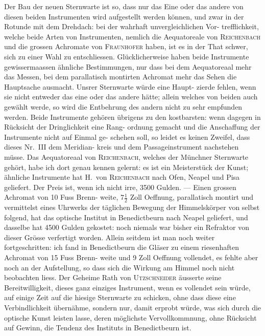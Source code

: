 \documentclass[12pt,a4paper]{article}
\theoremstyle{plain}
\theoremstyle{definition}
\theoremstyle{remark}
\begin{document}
Der Bau der neuen Sternwarte ist so, dass nur das Eine oder das andere
von diesen beiden Instrumenten wird aufgestellt werden k\"{o}nnen, und zwar in
der Rotunde mit dem Drehdach: bei der wahrhaft unvergleichlichen Vor-
trefflichkeit, welche beide Arten von Instrumenten, nemlich die Aequatoreale
von \textsc{Reichenbach} und die grossen Achromate von \textsc{Fraunhofer} haben, ist es in
der That schwer, sich zu einer Wahl zu entschliessen. Gl\"{u}cklicherweise haben
beide Instrumente gewissermaassen \"{a}hnliche Bestimmungen, nur dass bei dem
Aequatoreaal mehr das Messen, bei dem parallatisch montirten Achromat mehr
das Sehen die Hauptsache ausmacht. Unsrer Sternwarte w\"{u}rde eine Haupt-
zierde fehlen, wenn sie nicht entweder das eine oder das andere h\"{a}tte; allein
welches von beiden auch gew\"{a}hlt werde, so wird die Entbehrung des andern
nicht zu sehr empfunden werden. Beide Instrumente geh\"{o}ren \"{u}brigens zu
den kostbarsten: wenn dagegen in R\"{u}cksicht der Dringlichkeit eine Rang-
ordnung gemacht und die Anschaffung der Instrumente nicht auf Einmal ge-
schehen soll, so leidet es keinen Zweifel, dass dieses Nr.\ III dem Meridian-
kreis und dem Passageinstrument nachstehen m\"{u}sse. Das Aequatoreaal von
\textsc{Reichenbach}, welches der M\"{u}nchner Sternwarte geh\"{o}rt, habe ich dort genau
kennen gelernt: es ist ein Meisterst\"{u}ck der Kunst; \"{a}hnliche Instrumente hat
H.\ von \textsc{Reichenbach} nach Ofen, Neapel und Pisa geliefert. Der Preis ist, wenn
ich nicht irre, 3500 Gulden. --- Einen grossen Achromat von 10 Fuss Brenn-
weite, $7\frac{1}{2}$ Zoll Oeffnung, parallatisch montirt und vermittelst eines Uhrwerks
der t\"{a}glichen Bewegung der Himmelsk\"{o}rper von selbst folgend, hat das optische
Institut in Benedictbeurn nach Neapel geliefert, und dasselbe hat 4500 Gulden
gekostet: noch niemals war bisher ein Refraktor von dieser Gr\"{o}sse verfertigt
worden. Allein seitdem ist man noch weiter fortgeschritten: ich fand in
Benedictbeurn die Gl\"{a}ser zu einem riesenhaften Achromat von 15 Fuss Brenn-
weite und 9 Zoll Oeffnung vollendet, es fehlte aber noch an der Aufstellung,
so dass sich die Wirkung am Himmel noch nicht beobachten liess. Der
Geheime Rath von \textsc{Utzschneider} \"{a}usserte seine Bereitwilligkeit, dieses ganz
einziges Instrument, wenn es vollendet sein w\"{u}rde, auf einige Zeit auf die
hiesige Sternwarte zu schicken, ohne dass diese eine Verbindlichkeit \"{u}bern\"{a}hme,
sondern nur, damit erprobt w\"{u}rde, was sich durch die optische Kunst leisten
lasse, deren m\"{o}glichste Vervollkommnung, ohne R\"{u}cksicht auf Gewinn, die
Tendenz des Instituts in Benedictbeurn ist.
\end{document}
